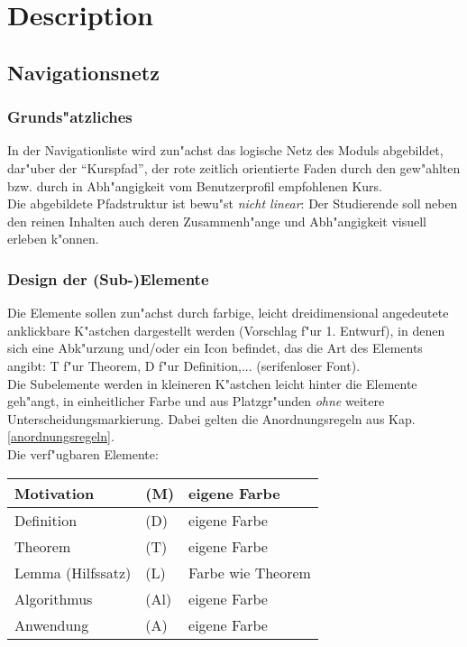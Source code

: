 
\section{Description}\label{description}


\subsection{Navigationsnetz}\label{navigationsnetz}


\subsubsection{Grunds"atzliches}\label{navi_netz_grundsaetzliches}

In der Navigationliste wird zun"achst das logische Netz des Moduls abgebildet,
dar"uber der ``Kurspfad'', der rote zeitlich orientierte Faden durch den
gew"ahlten bzw. durch in Abh"angigkeit vom Benutzerprofil empfohlenen Kurs.\\
Die abgebildete Pfadstruktur ist bewu"st \emph{nicht linear}: Der Studierende
soll neben den reinen Inhalten auch deren Zusammenh"ange und Abh"angigkeit
visuell erleben k"onnen.


\subsubsection{Design der (Sub-)Elemente}\label{}

Die Elemente sollen zun"achst durch farbige, leicht dreidimensional
angedeutete anklickbare K"astchen dargestellt werden (Vorschlag f"ur
1. Entwurf), in denen sich eine Abk"urzung und/oder ein Icon befindet,
das die Art des Elements angibt: T f"ur Theorem, D f"ur Definition,...
(serifenloser Font).\\
Die Subelemente werden in kleineren K"astchen leicht hinter die Elemente
geh"angt, in einheitlicher Farbe und aus Platzgr"unden \textit{ohne} weitere
Unterscheidungsmarkierung. Dabei gelten die Anordnungsregeln aus
Kap. \ref{anordnungsregeln}.\\

Die verf"ugbaren Elemente:
\begin{center}
\begin{tabular}{|l|l|l|}
\hline
Motivation              & (M)   & eigene Farbe          \\
\hline
\hline
Definition              & (D)   & eigene Farbe          \\
\hline
Theorem                 & (T)   & eigene Farbe          \\
\hline
Lemma (Hilfssatz)       & (L)   & Farbe wie Theorem     \\
\hline
Algorithmus             & (Al)  & eigene Farbe          \\
\hline
\hline
Anwendung               & (A)   & eigene Farbe          \\
\hline
\end{tabular}
\end{center}

